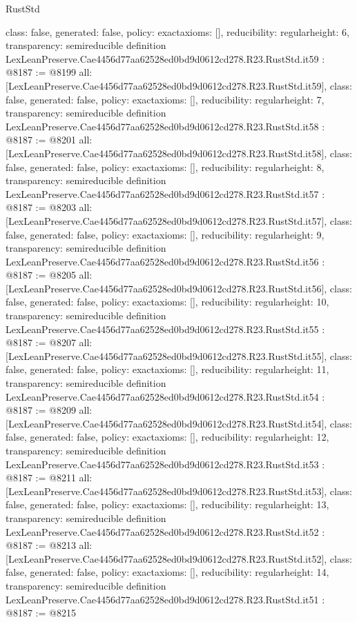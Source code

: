 \begin{lexlean}{RustStd}
\begin{coremodule}
{  class: false,
  generated: false,
  policy: exact{axioms: []},
  reducibility: regular{height: 6},
  transparency: semireducible
}
definition LexLeanPreserve.Cae4456d77aa62528ed0bd9d0612cd278.R23.RustStd.it59 : @8187 := @8199 {
  all: [LexLeanPreserve.Cae4456d77aa62528ed0bd9d0612cd278.R23.RustStd.it59],
  class: false,
  generated: false,
  policy: exact{axioms: []},
  reducibility: regular{height: 7},
  transparency: semireducible
}
definition LexLeanPreserve.Cae4456d77aa62528ed0bd9d0612cd278.R23.RustStd.it58 : @8187 := @8201 {
  all: [LexLeanPreserve.Cae4456d77aa62528ed0bd9d0612cd278.R23.RustStd.it58],
  class: false,
  generated: false,
  policy: exact{axioms: []},
  reducibility: regular{height: 8},
  transparency: semireducible
}
definition LexLeanPreserve.Cae4456d77aa62528ed0bd9d0612cd278.R23.RustStd.it57 : @8187 := @8203 {
  all: [LexLeanPreserve.Cae4456d77aa62528ed0bd9d0612cd278.R23.RustStd.it57],
  class: false,
  generated: false,
  policy: exact{axioms: []},
  reducibility: regular{height: 9},
  transparency: semireducible
}
definition LexLeanPreserve.Cae4456d77aa62528ed0bd9d0612cd278.R23.RustStd.it56 : @8187 := @8205 {
  all: [LexLeanPreserve.Cae4456d77aa62528ed0bd9d0612cd278.R23.RustStd.it56],
  class: false,
  generated: false,
  policy: exact{axioms: []},
  reducibility: regular{height: 10},
  transparency: semireducible
}
definition LexLeanPreserve.Cae4456d77aa62528ed0bd9d0612cd278.R23.RustStd.it55 : @8187 := @8207 {
  all: [LexLeanPreserve.Cae4456d77aa62528ed0bd9d0612cd278.R23.RustStd.it55],
  class: false,
  generated: false,
  policy: exact{axioms: []},
  reducibility: regular{height: 11},
  transparency: semireducible
}
definition LexLeanPreserve.Cae4456d77aa62528ed0bd9d0612cd278.R23.RustStd.it54 : @8187 := @8209 {
  all: [LexLeanPreserve.Cae4456d77aa62528ed0bd9d0612cd278.R23.RustStd.it54],
  class: false,
  generated: false,
  policy: exact{axioms: []},
  reducibility: regular{height: 12},
  transparency: semireducible
}
definition LexLeanPreserve.Cae4456d77aa62528ed0bd9d0612cd278.R23.RustStd.it53 : @8187 := @8211 {
  all: [LexLeanPreserve.Cae4456d77aa62528ed0bd9d0612cd278.R23.RustStd.it53],
  class: false,
  generated: false,
  policy: exact{axioms: []},
  reducibility: regular{height: 13},
  transparency: semireducible
}
definition LexLeanPreserve.Cae4456d77aa62528ed0bd9d0612cd278.R23.RustStd.it52 : @8187 := @8213 {
  all: [LexLeanPreserve.Cae4456d77aa62528ed0bd9d0612cd278.R23.RustStd.it52],
  class: false,
  generated: false,
  policy: exact{axioms: []},
  reducibility: regular{height: 14},
  transparency: semireducible
}
definition LexLeanPreserve.Cae4456d77aa62528ed0bd9d0612cd278.R23.RustStd.it51 : @8187 := @8215 {
}
\end{coremodule}
\end{lexlean}
